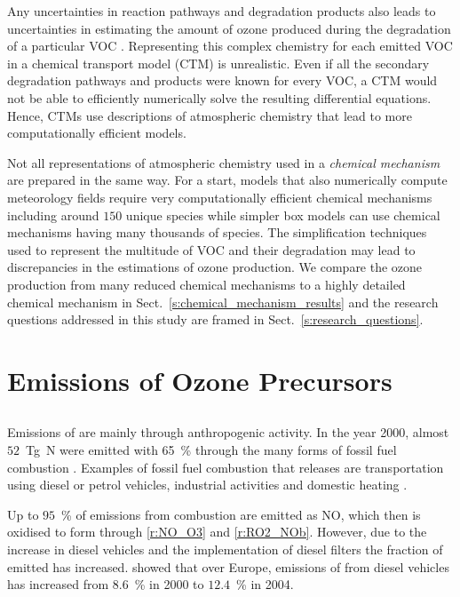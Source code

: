 Any uncertainties in reaction pathways and degradation products also leads to uncertainties in estimating the amount of ozone produced during the degradation of a particular VOC \citep{Atkinson:2000}.
Representing this complex chemistry for each emitted VOC in a chemical transport model (CTM) is unrealistic.
Even if all the secondary degradation pathways and products were known for every VOC, a CTM would not be able to efficiently numerically solve the resulting differential equations.
Hence, CTMs use descriptions of atmospheric chemistry that lead to more computationally efficient models.

Not all representations of atmospheric chemistry used in a \emph{chemical mechanism} are prepared in the same way.
For a start, models that also numerically compute meteorology fields require very computationally efficient chemical mechanisms including around $150$ unique species while simpler box models can use chemical mechanisms having many thousands of species.
The simplification techniques used to represent the multitude of VOC and their degradation may lead to discrepancies in the estimations of ozone production.
We compare the ozone production from many reduced chemical mechanisms to a highly detailed chemical mechanism in Sect.~\ref{s:chemical_mechanism_results} and the research questions addressed in this study are framed in Sect.~\ref{s:research_questions}.

\section{Emissions of Ozone Precursors} \label{s:precursor_emissions}
\subsection[NOx]{}
Emissions of  are mainly through anthropogenic activity.
In the year 2000, almost $52$~Tg~N were emitted with 65~\% through the many forms of fossil fuel combustion \citep{Seinfeld:2006}. 
Examples of fossil fuel combustion that releases  are transportation using diesel or petrol vehicles, industrial activities and domestic heating \citep{vonSchneidemesser:2015}.

Up to $95$~\% of  emissions from combustion are emitted as NO, which then is oxidised to form  through \eqref{r:NO_O3} and \eqref{r:RO2_NOb}.
However, due to the increase in diesel vehicles and the implementation of diesel filters the fraction of emitted  has increased.
\citet{Grice:2009} showed that over Europe, emissions of  from diesel vehicles has increased from $8.6$~\% in 2000 to $12.4$~\% in 2004.

